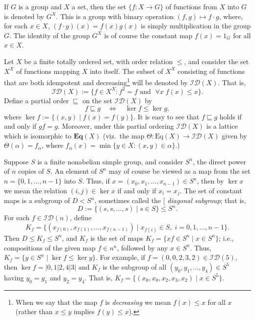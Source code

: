 \documentclass[cm,dissertation,actual,final]{uhthesis}
\theoremstyle{plain}
\theoremstyle{definition}
\theoremstyle{remark}
\numberwithin{theorem}{section}
\numberwithin{claim}{chapter}
\numberwithin{equation}{section}
\numberwithin{conjecture}{chapter}
\newcommand{\<}{\ensuremath{\langle}}
\renewcommand{\>}{\ensuremath{\rangle}}
\renewcommand{\leq}{\ensuremath{\leqslant}}
\newcommand{\ID}[1]{\ensuremath{\mathcal{ID}(#1)}}
\newcommand{\EqX}{\ensuremath{\mbox{Eq}(X)}}
\newcommand{\bEqX}{\ensuremath{\mathbf{Eq}(X)}}
\newcommand{\0}{\ensuremath{\mathbf{0}}}
\newcommand{\1}{\ensuremath{\mathbf{1}}}
\newcommand{\2}{\ensuremath{\mathbf{2}}}
\newcommand{\3}{\ensuremath{\mathbf{3}}}
\newcommand{\4}{\ensuremath{\mathbf{4}}}
\newcommand{\5}{\ensuremath{\mathbf{5}}}
\newcommand{\bn}{\ensuremath{\mathbf{n}}}
\newcommand{\indexit}[1]{\index{#1|textit}}
\def\defn#1{\gdef\defnstring{#1}%
  \xdef\dodefnii{{\noexpand\em
       \defnstring}\noexpand\indexit{\defnstring}\noexpand\makeatother}%
  \futurelet\nextthing\dodefn}
\def\dodefn{%
  \ifx\nextthing[\let\next=\dodefni
    \else\let\next=\dodefnii\fi
  \makeatletter
  \next}
\def\dodefni[#1]{%
  {\em\defnstring}%
  \indexit{#1}%
  \makeatother}
\begin{document}
If $G$ is a group and $X$ a set, then the set $\{f : X\rightarrow G\}$ of 
functions from $X$ into $G$ is denoted by $G^X$.  This is a group with binary
operation $(f,g) \mapsto f\cdot g$, where,  
for each $x\in X$, $(f\cdot g)(x)= f(x)g(x)$ is simply multiplication
in the group $G$.  The identity of the group $G^X$ is of course the constant map $f(x) =
1_G$ for all $x\in X$.

Let $X$ be a finite totally ordered set, with order relation $\leq$,
and consider the set $X^X$ of functions mapping $X$ into itself.  
The subset of $X^X$ consisting of functions that are both idempotent and
decreasing\footnote{When we say that the map $f$ is \emph{decreasing} we mean
  $f(x)\leq x$ for all $x$ (rather than $x\leq y$ implies $f(y) \leq x$).}
 will be denoted by $\ID{X}$.  That is,
\[
\ID{X} := \{f\in X^X: f^2 = f \text{ and }\; \forall x\; f(x) \leq x\}.
\]
Define a partial order $\sqsubseteq$ on the set $\ID{X}$ by
\begin{equation}
  \label{eq:MID111}
 f\sqsubseteq g \quad \Leftrightarrow \quad \ker f \leq \ker g,
\end{equation}
where $\ker f := \{(x,y) \mid f(x) = f(y)\}$.
It is easy to see that $f\sqsubseteq g$ holds if and only if $gf = g$.  
Moreover, under this partial ordering $\ID{X}$ is a lattice which is 
isomorphic to $\bEqX$ (viz.~the map $\Theta : \EqX \rightarrow
\ID{X}$ given by $\Theta(\alpha) = f_\alpha$, where
$f_\alpha(x) = \min\{y\in X: (x,y)\in \alpha\}$.) %

\renewcommand{\bn}{\ensuremath{n}}  %
\renewcommand{\5}{\ensuremath{5}}  %

Suppose $S$ is a finite nonabelian simple
group, and consider $S^\bn$, the direct power of $n$ copies of $S$.
An element of $S^\bn$ may of course be viewed as a map from the set 
$\bn = \{0, 1, \dots, n-1\}$ into $S$.  Thus, if 
$x = (x_0, x_1, \dots, x_{n-1})\in S^n$, then by 
$\ker x$ we mean the relation $(i,j) \in \ker x$ if and only if $x_i = x_j$.
The set of constant maps is a subgroup of $D < S^\bn$, sometimes called the
\defn{diagonal subgroup}; that is,
\[
D := \{(s, s, \dots, s) \mid s\in S\} \leq S^\bn.
\]
For each $f \in \ID{\bn}$, define
\[
K_f = \{(x_{f(0)}, x_{f(1)}, \dots, x_{f(n-1)}) \mid x_{f(i)}\in S, \; i = 0, 1,
\dots, n-1\}.
\]
Then $D \leq K_f\leq S^\bn$, and $K_f$ is the set of maps
$K_f = \{x f \in S^\bn \mid x \in S^\bn \}$; i.e., compositions of the given
map $f\in n^n$, followed by  any $x\in S^n$.  Thus, 
$K_f = \{ y\in S^n \mid \ker f \leq \ker y \}$.
For example, 
if $f = (0, 0, 2, 3, 2)\in \ID{\5}$, then 
$\ker f = |0,1|2,4|3|$ and 
$K_f$ is the subgroup %
of all $(y_0, y_1, \dots, y_4)\in S^\5$ having $y_0 = y_1$ and $y_2 = y_4$. That is,
$K_f = \{(x_{0}, x_{0}, x_2, x_3, x_2) \mid x\in S^5\}$.
\end{document}
